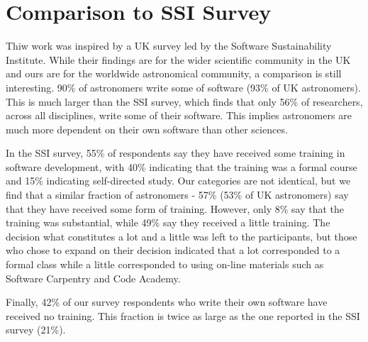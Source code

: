 \section{Comparison to SSI Survey}
\label{sec:ssicompare}

Thiw work was inspired by a UK survey led by the Software Sustainability Institute. While their findings are for the wider scientific community in the UK and ours are for the worldwide astronomical community, a comparison is still interesting. 90\% of astronomers write some of software (93\% of UK astronomers). This is much larger than the SSI survey, which finds that only 56\% of researchers, across all disciplines, write some of their software.  This implies astronomers are much more dependent on their own software than other sciences.

In the SSI survey, 55\% of respondents say they have received some training in software development, with 40\% indicating that the training was a formal course and 15\% indicating self-directed study. Our categories are not identical, but we find that a similar fraction of astronomers - 57\% (53\% of UK astronomers) say that they have received some form of training. However, only 8\% say that the training was substantial, while 49\% say they received a little training. The decision what constitutes a lot and a little was left to the participants, but those who chose to expand on their decision indicated that a lot corresponded to a formal class while a little corresponded to using on-line materials such as Software Carpentry and Code Academy.

Finally, 42\% of our survey respondents who write their own software have received no training. This fraction is twice as large as the one reported in the SSI survey (21\%).  


